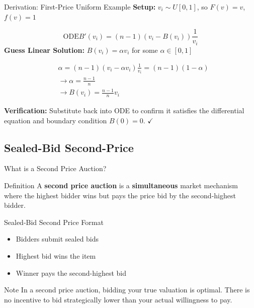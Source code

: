 \documentclass[xcolor={x11names}]{beamer}
\begin{document}
\begin{frame}{Derivation: First-Price Uniform Example}
\textbf{Setup:} $v_i \sim U[0,1]$, so $F(v) = v$, $f(v) = 1$

$$\text{ODE} B'(v_i) = (n-1)(v_i - B(v_i))\frac{1}{v_i}$$
\textbf{Guess Linear Solution:} $B(v_i) = \alpha v_i$ for some $\alpha \in [0,1]$

\begin{align*}
& \alpha = (n-1)(v_i - \alpha v_i)\frac{1}{v_i} = (n-1)(1 - \alpha) \\
& \rightarrow\alpha = \frac{n-1}{n} \\
& \rightarrow \boxed{B(v_i) = \frac{n-1}{n} v_i}
\end{align*}

\textbf{Verification:} Substitute back into ODE to confirm it satisfies the differential equation and boundary condition $B(0) = 0$. $\checkmark$
\end{frame}

\subsection{Sealed-Bid Second-Price }
\begin{frame}{What is a Second Price Auction?}
\begin{block}{Definition}
A \textbf{second price auction} is a \textbf{simultaneous} market mechanism where the highest bidder wins but pays the price bid by the second-highest bidder. 
\end{block}

\begin{exampleblock}{Sealed-Bid Second Price Format}
\begin{itemize}
\item Bidders submit sealed bids
\item Highest bid wins the item
\item Winner pays the second-highest bid
\end{itemize}
\end{exampleblock}

\begin{alertblock}{Note}
In a second price auction, bidding your true valuation is optimal. There is no incentive to bid strategically lower than your actual willingness to pay.
\end{alertblock}
\end{frame}
\end{document}
